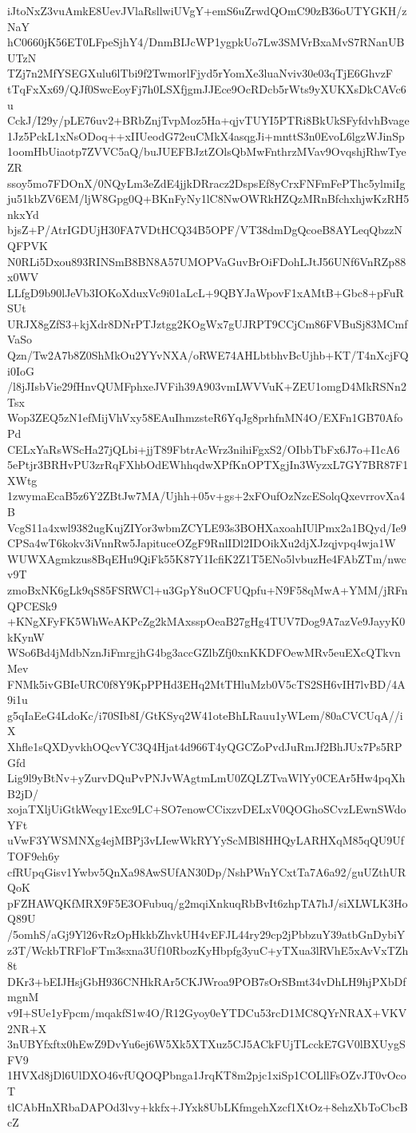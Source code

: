 iJtoNxZ3vuAmkE8UevJVlaRsllwiUVgY+emS6uZrwdQOmC90zB36oUTYGKH/zNaY
hC0660jK56ET0LFpeSjhY4/DnmBIJcWP1ygpkUo7Lw3SMVrBxaMvS7RNanUBUTzN
TZj7n2MfYSEGXulu6lTbi9f2TwmorlFjyd5rYomXe3luaNviv30e03qTjE6GhvzF
tTqFxXx69/QJf0SwcEoyFj7h0LSXfjgmJJEce9OcRDcb5rWts9yXUKXsDkCAVc6u
CckJ/I29y/pLE76uv2+BRbZnjTvpMoz5Ha+qjvTUYI5PTRi8BkUkSFyfdvhBvage
1Jz5PckL1xNsODoq++xIIUeodG72euCMkX4asqgJi+mnttS3n0EvoL6lgzWJinSp
1oomHbUiaotp7ZVVC5aQ/buJUEFBJztZOlsQbMwFnthrzMVav9OvqshjRhwTyeZR
ssoy5mo7FDOnX/0NQyLm3eZdE4jjkDRracz2DspsEf8yCrxFNFmFePThc5ylmiIg
ju51kbZV6EM/ljW8Gpg0Q+BKnFyNy1lC8NwOWRkHZQzMRnBfchxhjwKzRH5nkxYd
bjsZ+P/AtrIGDUjH30FA7VDtHCQ34B5OPF/VT38dmDgQcoeB8AYLeqQbzzNQFPVK
N0RLi5Dxou893RINSmB8BN8A57UMOPVaGuvBrOiFDohLJtJ56UNf6VnRZp88x0WV
LLfgD9b90lJeVb3IOKoXduxVc9i01aLcL+9QBYJaWpovF1xAMtB+Gbc8+pFuRSUt
URJX8gZfS3+kjXdr8DNrPTJztgg2KOgWx7gUJRPT9CCjCm86FVBuSj83MCmfVaSo
Qzn/Tw2A7b8Z0ShMkOu2YYvNXA/oRWE74AHLbtbhvBcUjhb+KT/T4nXcjFQi0IoG
/l8jJIsbVie29fHnvQUMFphxeJVFih39A903vmLWVVuK+ZEU1omgD4MkRSNn2Tsx
Wop3ZEQ5zN1efMijVhVxy58EAuIhmzsteR6YqJg8prhfnMN4O/EXFn1GB70AfoPd
CELxYaRsWScHa27jQLbi+jjT89FbtrAcWrz3nihiFgxS2/OIbbTbFx6J7o+I1cA6
5ePtjr3BRHvPU3zrRqFXhbOdEWhhqdwXPfKnOPTXgjIn3WyzxL7GY7BR87F1XWtg
1zwymaEcaB5z6Y2ZBtJw7MA/Ujhh+05v+gs+2xFOufOzNzcESolqQxevrrovXa4B
VcgS11a4xwl9382ugKujZIYor3wbmZCYLE93s3BOHXaxoahIUlPmx2a1BQyd/Ie9
CPSa4wT6kokv3iVnnRw5JapituceOZgF9RnlIDl2IDOikXu2djXJzqjvpq4wja1W
WUWXAgmkzus8BqEHu9QiFk55K87Y1IcfiK2Z1T5ENo5lvbuzHe4FAbZTm/nwcv9T
zmoBxNK6gLk9qS85FSRWCl+u3GpY8uOCFUQpfu+N9F58qMwA+YMM/jRFnQPCESk9
+KNgXFyFK5WhWeAKPcZg2kMAxsspOeaB27gHg4TUV7Dog9A7azVe9JayyK0kKynW
WSo6Bd4jMdbNznJiFmrgjhG4bg3accGZlbZfj0xnKKDFOewMRv5euEXcQTkvnMev
FNMk5ivGBIeURC0f8Y9KpPPHd3EHq2MtTHluMzb0V5cTS2SH6vIH7lvBD/4A9i1u
g5qIaEeG4LdoKc/i70SIb8I/GtKSyq2W41oteBhLRauu1yWLem/80aCVCUqA//iX
Xhfle1sQXDyvkhOQcvYC3Q4Hjat4d966T4yQGCZoPvdJuRmJf2BhJUx7Ps5RPGfd
Lig9l9yBtNv+yZurvDQuPvPNJvWAgtmLmU0ZQLZTvaWlYy0CEAr5Hw4pqXhB2jD/
xojaTXljUiGtkWeqy1Exc9LC+SO7enowCCixzvDELxV0QOGhoSCvzLEwnSWdoYFt
uVwF3YWSMNXg4ejMBPj3vLIewWkRYYyScMBl8HHQyLARHXqM85qQU9UfTOF9eh6y
cfRUpqGisv1Ywbv5QnXa98AwSUfAN30Dp/NshPWnYCxtTa7A6a92/guUZthURQoK
pFZHAWQKfMRX9F5E3OFubuq/g2mqiXnkuqRbBvIt6zhpTA7hJ/siXLWLK3HoQ89U
/5omhS/aGj9Yl26vRzOpHkkbZhvkUH4vEFJL44ry29cp2jPbbzuY39atbGnDybiY
z3T/WckbTRFloFTm3sxna3Uf10RbozKyHbpfg3yuC+yTXua3lRVhE5xAvVxTZh8t
DKr3+bEIJHsjGbH936CNHkRAr5CKJWroa9POB7sOrSBmt34vDhLH9hjPXbDfmgnM
v9I+SUe1yFpcm/mqakfS1w4O/R12Gyoy0eYTDCu53rcD1MC8QYrNRAX+VKV2NR+X
3nUBYfxftx0hEwZ9DvYu6ej6W5Xk5XTXuz5CJ5ACkFUjTLcckE7GV0lBXUygSFV9
1HVXd8jDl6UlDXO46vfUQOQPbnga1JrqKT8m2pjc1xiSp1COLllFsOZvJT0vOcoT
tlCAbHnXRbaDAPOd3lvy+kkfx+JYxk8UbLKfmgehXzcf1XtOz+8ehzXbToCbcBcZ
